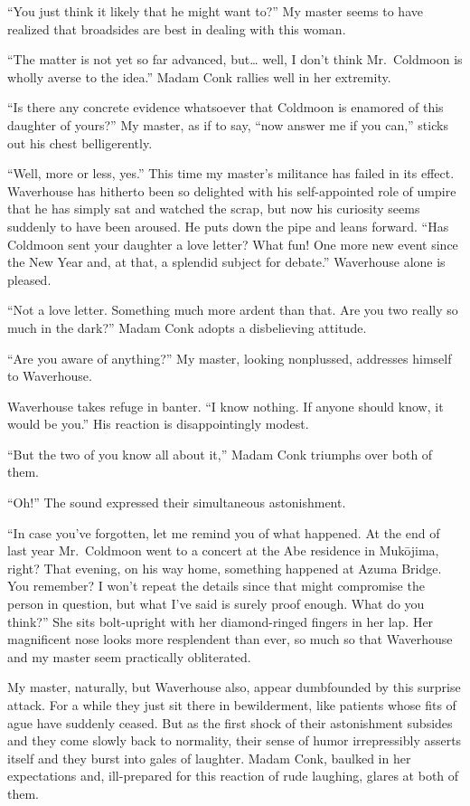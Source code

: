 \documentclass{book}
\begin{document}
``You just think it likely that he might want to?'' My master seems to
have realized that broadsides are best in dealing with this woman.

``The matter is not yet so far advanced, but\ldots{} well, I don't think
Mr.~Coldmoon is wholly averse to the idea.'' Madam Conk rallies well in
her extremity.

``Is there any concrete evidence whatsoever that Coldmoon is enamored of
this daughter of yours?'' My master, as if to say, ``now answer me if
you can,'' sticks out his chest belligerently.

``Well, more or less, yes.'' This time my master's militance has failed
in its effect. Waverhouse has hitherto been so delighted with his
self-appointed role of umpire that he has simply sat and watched the
scrap, but now his curiosity seems suddenly to have been aroused. He
puts down the pipe and leans forward. ``Has Coldmoon sent your daughter
a love letter? What fun! One more new event since the New Year and, at
that, a splendid subject for debate.'' Waverhouse alone is pleased.

``Not a love letter. Something much more ardent than that. Are you two
really so much in the dark?'' Madam Conk adopts a disbelieving attitude.

``Are you aware of anything?'' My master, looking nonplussed, addresses
himself to Waverhouse.

Waverhouse takes refuge in banter. ``I know nothing. If anyone should
know, it would be you.'' His reaction is disappointingly modest.

``But the two of you know all about it,'' Madam Conk triumphs over both
of them.

``Oh!'' The sound expressed their simultaneous astonishment.

``In case you've forgotten, let me remind you of what happened. At the
end of last year Mr.~Coldmoon went to a concert at the Abe residence in
Mukōjima, right? That evening, on his way home, something happened at
Azuma Bridge. You remember? I won't repeat the details since that might
compromise the person in question, but what I've said is surely proof
enough. What do you think?'' She sits bolt-upright with her
diamond-ringed fingers in her lap. Her magnificent nose looks more
resplendent than ever, so much so that Waverhouse and my master seem
practically obliterated.

My master, naturally, but Waverhouse also, appear dumbfounded by this
surprise attack. For a while they just sit there in bewilderment, like
patients whose fits of ague have suddenly ceased. But as the first shock
of their astonishment subsides and they come slowly back to normality,
their sense of humor irrepressibly asserts itself and they burst into
gales of laughter. Madam Conk, baulked in her expectations and,
ill-prepared for this reaction of rude laughing, glares at both of them.
\end{document}
